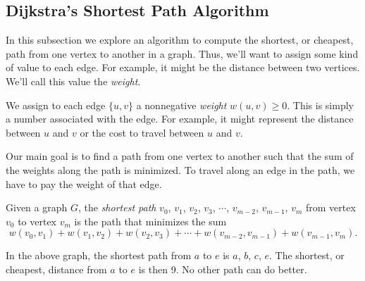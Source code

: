 \documentclass[11pt]{article}
\begin{document}
\subsection{Dijkstra's Shortest Path Algorithm}

In this subsection we explore an algorithm to compute the shortest, or cheapest, path from one vertex to another in a graph.
Thus, we'll want to assign some kind of value to each edge. For example, it might be the distance between two
vertices. We'll call this value the \textit{weight}.

\begin{definition}
\label{def:weight}
We assign to each edge $\{u,v\}$ a nonnegative \textit{weight} $w(u,v) \ge 0$. This is simply a number associated with the edge.
For example, it might represent the distance between $u$ and $v$ or the cost to travel between $u$ and $v$.
\end{definition}

Our main goal is to find a path from one vertex to another such that the sum of the weights along the path is
minimized. To travel along an edge in the path, we have to pay the weight of that edge.

\begin{definition}
\label{def:shortest-path}
Given a graph $G$, the \textit{shortest path} $v_0$, $v_1$, $v_2$, $v_3$, $\cdots$, $v_{m-2}$, $v_{m-1}$, $v_m$
from vertex $v_0$ to vertex $v_m$ is the path that minimizes
the sum
\[w(v_0,v_1) + w(v_1,v_2) + w(v_2, v_3) + \cdots + w(v_{m-2}, v_{m-1}) + w(v_{m-1}, v_{m}).\]
\begin{center}
\end{center}
In the above graph, the shortest path from $a$ to $e$ is $a$, $b$, $c$, $e$. The shortest, or cheapest,
distance from $a$ to $e$ is then 9. No other path can do better.
\end{definition}
\end{document}
